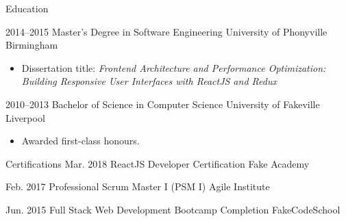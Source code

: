 \documentclass{londoncv}
\begin{document}
\begin{cvcontainer}{Education}

	\chronologicalitem
	{2014--2015}
	{Master's Degree in Software Engineering}
	{University of Phonyville}
	{Birmingham}
	{
	\begin{itemize}
		\item Dissertation title: \textit{Frontend Architecture and Performance Optimization: Building Responsive User Interfaces with ReactJS and Redux}
	\end{itemize}
	}

	\chronologicalitem
	{2010--2013}
	{Bachelor of Science in Computer Science}
	{University of Fakeville}
	{Liverpool}
	{
	\begin{itemize}
		\item Awarded first-class honours.
	\end{itemize}
	}

\end{cvcontainer}

\begin{cvcontainer}{Certifications}
	\chronologicalitem
	{Mar. 2018}
	{ReactJS Developer Certification}
	{Fake Academy}
	{}
	{}

	\chronologicalitem
	{Feb. 2017}
	{Professional Scrum Master I (PSM I)}
	{Agile Institute}
	{}
	{}

	\chronologicalitem
	{Jun. 2015}
	{Full Stack Web Development Bootcamp Completion}
	{FakeCodeSchool}
	{}
	{}
\end{cvcontainer}
\end{document}
